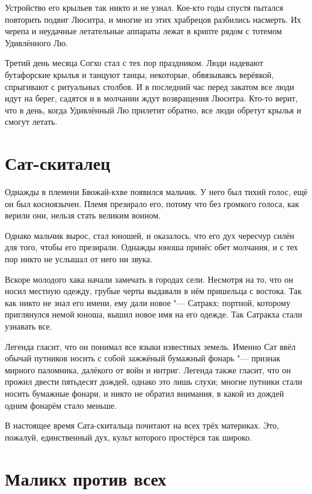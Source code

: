 \documentclass[a4paper,10pt]{book}
\begin{document}
Устройство его крыльев так никто и не узнал. Кое-кто годы 
спустя пытался повторить подвиг Люситра, и многие из этих храбрецов разбились 
насмерть. Их черепа и неудачные летательные аппараты лежат в крипте рядом с 
тотемом Удивлённого Лю.

Третий день месяца Согхо стал с тех пор праздником. Люди надевают 
бутафорские крылья и танцуют танцы, некоторые, обвязываясь верёвкой, спрыгивают 
с ритуальных столбов. И в последний час перед закатом все люди идут на берег, 
садятся и в молчании ждут возвращения Люситра. Кто-то верит, что в день, когда 
Удивлённый Лю прилетит обратно, все люди обретут крылья и смогут летать.


\section{Сат-скиталец}

Однажды в племени Бвожай-кхве появился мальчик. У него был тихий голос, ещё он 
был косноязычен. Племя презирало его, потому что без громкого голоса, как 
верили 
они, нельзя стать великим воином.

Однако мальчик вырос, стал юношей, и оказалось, что его дух чересчур силён для 
того, чтобы его презирали. Однажды юноша принёс обет молчания, и с тех пор 
никто 
не услышал от него ни звука.

Вскоре молодого хака начали замечать в городах сели. Несмотря на то, что он 
носил местную одежду, грубые черты выдавали в нём пришельца с востока. Так как 
никто не знал его имени, ему дали новое "--- Сатракх; портной, которому 
приглянулся немой юноша, вышил новое имя на его одежде. Так Сатракха стали 
узнавать все.

Легенда гласит, что он понимал все языки известных земель. Именно Сат ввёл 
обычай путников носить с собой зажжёный бумажный фонарь "--- признак мирного 
паломника, далёкого от войн и интриг. Легенда также гласит, что он прожил 
двести 
пятьдесят дождей, однако это лишь слухи; многие путники стали носить бумажные 
фонари, и никто не обратил внимания, в какой из дождей одним фонарём стало 
меньше.

В настоящее время Сата-скитальца почитают на всех трёх материках. Это, пожалуй, 
единственный дух, культ которого простёрся так широко.

\section{Маликх против всех}
\end{document}
